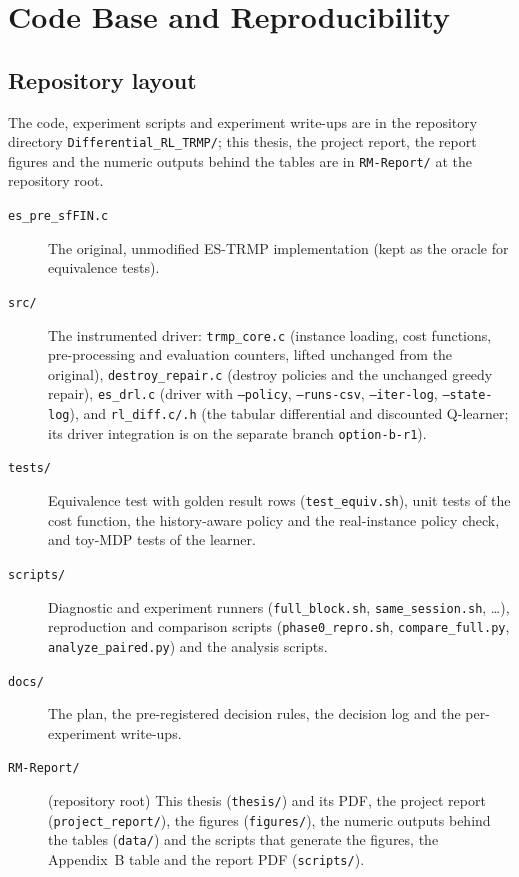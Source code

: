 
\chapter{Code Base and Reproducibility}\label{AppendixC}

\section{Repository layout}

The code, experiment scripts and experiment write-ups are in the repository directory \texttt{Differential\_RL\_TRMP/}; this thesis, the project report, the report figures and the numeric outputs behind the tables are in \texttt{RM-Report/} at the repository root.

\begin{description}
\item[\texttt{es\_pre\_sfFIN.c}] The original, unmodified ES-TRMP implementation (kept as the oracle for equivalence tests).
\item[\texttt{src/}] The instrumented driver: \texttt{trmp\_core.c} (instance loading, cost functions, pre-processing and evaluation counters, lifted unchanged from the original), \texttt{destroy\_repair.c} (destroy policies and the unchanged greedy repair), \texttt{es\_drl.c} (driver with \texttt{--policy}, \texttt{--runs-csv}, \texttt{--iter-log}, \texttt{--state-log}), and \texttt{rl\_diff.c/.h} (the tabular differential and discounted Q-learner; its driver integration is on the separate branch \texttt{option-b-r1}).
\item[\texttt{tests/}] Equivalence test with golden result rows (\texttt{test\_equiv.sh}), unit tests of the cost function, the history-aware policy and the real-instance policy check, and toy-MDP tests of the learner.
\item[\texttt{scripts/}] Diagnostic and experiment runners (\texttt{full\_block.sh}, \texttt{same\_session.sh}, \ldots), reproduction and comparison scripts (\texttt{phase0\_repro.sh}, \texttt{compare\_full.py}, \texttt{analyze\_paired.py}) and the analysis scripts.
\item[\texttt{docs/}] The plan, the pre-registered decision rules, the decision log and the per-experiment write-ups.
\item[\texttt{RM-Report/}] (repository root) This thesis (\texttt{thesis/}) and its PDF, the project report (\texttt{project\_report/}), the figures (\texttt{figures/}), the numeric outputs behind the tables (\texttt{data/}) and the scripts that generate the figures, the Appendix~B table and the report PDF (\texttt{scripts/}).
\end{description}

